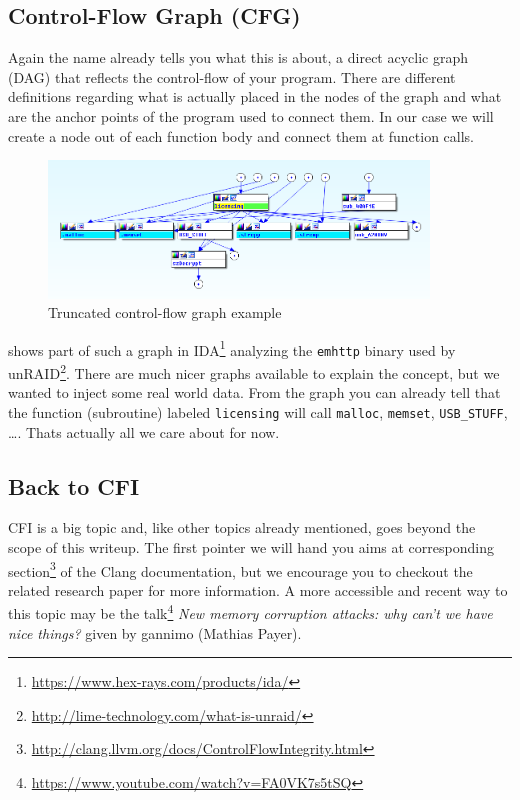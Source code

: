 \documentclass[article]{uibk}
\begin{document}
\subsection{Control-Flow Graph (CFG)}

Again the name already tells you what this is about, a direct acyclic graph
(DAG) that reflects the control-flow of your program. There are different
definitions regarding what is actually placed in the nodes of the graph and
what are the anchor points of the program used to connect them. In our case we
will create a node out of each function body and connect them at function
calls.

\begin{figure}[H]
    \centering
    \includegraphics[width=0.9\textwidth]{gfx/unraid_part_graph.png}
    \caption{Truncated control-flow graph example}
    \label{fig:cfg}
\end{figure}

 shows part of such a graph in
IDA\footnote{\url{https://www.hex-rays.com/products/ida/}} analyzing the
\texttt{emhttp} binary used by
unRAID\footnote{\url{http://lime-technology.com/what-is-unraid/}}. There are
much nicer graphs available to explain the concept, but we wanted to inject
some real world data. From the graph you can already tell that the function
(subroutine) labeled \texttt{licensing} will call \texttt{malloc},
\texttt{memset}, \texttt{USB\_STUFF}, \dots. Thats actually all we care about
for now.

\subsection{Back to CFI}

CFI is a big topic and, like other topics already mentioned, goes beyond the
scope of this writeup. The first pointer we will hand you aims at corresponding
section\footnote{\url{http://clang.llvm.org/docs/ControlFlowIntegrity.html}} of
the Clang documentation, but we encourage you to checkout the related research
paper \cite{ms_cfi} for more information. A more accessible and recent way to
this topic may be the
talk\footnote{\url{https://www.youtube.com/watch?v=FA0VK7s5tSQ}} \textit{New
memory corruption attacks: why can't we have nice things?} given by gannimo
(Mathias Payer).
\end{document}

